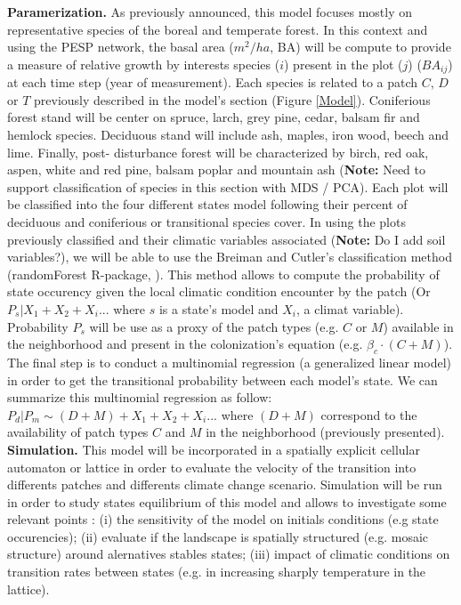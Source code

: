 \textbf{Paramerization.} As previously announced, this model focuses mostly on
representative species of the boreal and temperate forest. In this context and
using the PESP network, the basal area ($m^2/ha$, BA) will be compute to
provide a measure of relative growth by interests species ($i$) present in the
plot ($j$) ($BA_{ij}$) at each time step (year of measurement). Each species
is related to a patch $C$, $D$ or $T$ previously described in the model's
section (Figure \ref{Model}). Coniferious forest stand will be center on
spruce, larch, grey pine, cedar, balsam fir and hemlock species. Deciduous
stand will include ash, maples, iron wood, beech and lime. Finally, post-
disturbance forest will be characterized by birch, red oak, aspen, white and
red pine, balsam poplar and mountain ash (\textbf{Note:} Need to support
classification of species in this section with MDS / PCA). Each plot will be
classified into the four different states model following their percent of
deciduous and coniferious or transitional species cover. In using the plots
previously classified and their climatic variables associated (\textbf{Note:}
Do I add soil variables?), we will be able to use the Breiman and Cutler's
classification method (randomForest R-package, \cite{Liaw2002a}). This method
allows to compute the probability of state occurency given the local climatic
condition encounter by the patch (Or $P_{s}|X_1+X_2+X_i...$ where $s$ is a
state's model and $X_i$, a climat variable). Probability $P_s$ will be use as
a proxy of the patch types (e.g. $C$ or $M$) available in the neighborhood and
present in the colonization's equation (e.g. $\beta_c \cdot (C+M)$). The final
step is to conduct a multinomial regression (a generalized linear model) in
order to get the transitional probability between each model's state. We can
summarize this multinomial regression as follow: $P_{d}|P_{m} \sim (D+M) +
X_1+X_2+X_i... $ where $(D+M)$ correspond to the availability of patch types
$C$ and $M$ in the neighborhood (previously presented).\\



\textbf{Simulation.} This model will be incorporated in a spatially explicit
cellular automaton or lattice in order to evaluate the velocity of the
transition into differents patches and differents climate change scenario.
Simulation will be run in order to study states equilibrium of this model and
allows to investigate some relevant points : (i) the sensitivity of
the model on initials conditions (e.g state occurencies); (ii) evaluate if the
landscape is spatially structured (e.g. mosaic structure) around alernatives
stables states; (iii) impact of climatic conditions on transition rates
between states (e.g. in increasing sharply temperature in the lattice). \\

